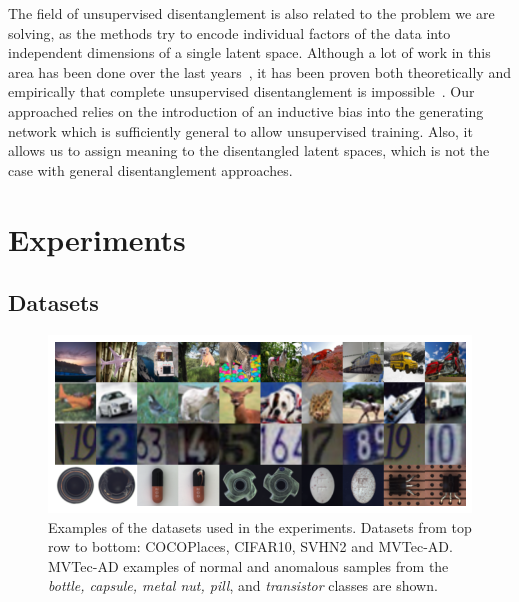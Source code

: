 The field of unsupervised disentanglement is also related to the problem we are solving, as the methods try to encode individual factors of the data into independent dimensions of a single latent space. Although a lot of work in this area has been done over the last years~\cite{burgess2018understanding, kim2018disentangling, esmaeili2019structuredhfvae, tschannen2018recent, bai2021contrastively, kim2019bayes}, it has been proven both theoretically and empirically that complete unsupervised disentanglement is impossible~\cite{locatello2019challenging, khemakhem2020variational, gabbay2021image}. Our approached relies on the introduction of an inductive bias into the generating network which is sufficiently general to allow unsupervised training. Also, it allows us to assign meaning to the disentangled latent spaces, which is not the case with general disentanglement approaches.


\section{Experiments} \label{sec:experiments}

\subsection{Datasets} \label{sec:datasets}

\begin{figure}
    \centering
    \includegraphics[width=\textwidth]{data/chapter_sgvaegan/all_grid.png}
    \caption{Examples of the datasets used in the experiments. Datasets from top row to bottom: COCOPlaces, CIFAR10, SVHN2 and MVTec-AD. MVTec-AD examples of normal and anomalous samples from the \textit{bottle, capsule, metal nut, pill}, and \textit{transistor} classes are shown.}
    \label{fig:all_grid}
\end{figure}

